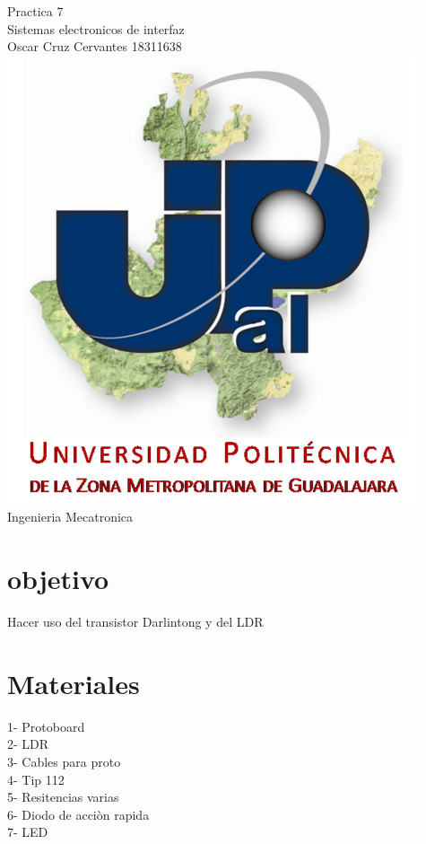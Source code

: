\documentclass[12pt,a4paper]{report}
\author{Oscar Cruz Cervantes}
\begin{document}
\begin{center}
Practica 7\\
Sistemas electronicos de interfaz\\
Oscar Cruz Cervantes 18311638\\
\includegraphics[scale=1.5]{01.png}\\
Ingenieria Mecatronica\\
\end{center}

\newpage
\section{objetivo}
Hacer uso del transistor Darlintong y del LDR\\
\section{Materiales}
1- Protoboard\\
2- LDR\\
3- Cables para proto\\
4- Tip 112\\
5- Resitencias varias\\
6- Diodo de acciòn rapida\\
7- LED
\end{document}
